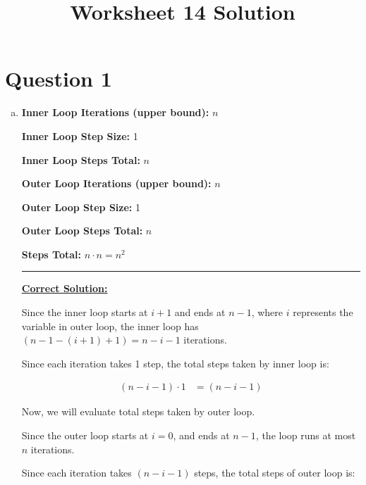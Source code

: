 \documentclass[12pt]{article}
\begin{document}
\title{Worksheet 14 Solution}
\maketitle

\section*{Question 1}
\begin{enumerate}[a.]
    \item

    \textbf{Inner Loop Iterations (upper bound):} $n$

    \textbf{Inner Loop Step Size:} 1

    \textbf{Inner Loop Steps Total:} $n$

    \bigskip

    \textbf{Outer Loop Iterations (upper bound):} $n$

    \textbf{Outer Loop Step Size:} 1

    \textbf{Outer Loop Steps Total:} $n$

    \bigskip

    \textbf{Steps Total:} $n \cdot n = n^2$

    \noindent\rule{\textwidth}{1pt}

    \bigskip

    \underline{\textbf{Correct Solution:}}

    Since the inner loop starts at $i+1$ and ends at $n-1$, where $i$ represents
    the variable in outer loop, the inner loop has $(n-1 - (i+1) + 1) = n - i - 1$
    iterations.

    \bigskip

    Since each iteration takes 1 step, the total steps taken by inner loop is:

    \begin{align}
        (n - i - 1) \cdot 1 &= (n - i - 1)
    \end{align}

    \bigskip

    Now, we will evaluate total steps taken by outer loop.

    \bigskip

    Since the outer loop starts at $i = 0$, and ends at $n-1$, the loop runs
    at most $n$ iterations.

    \bigskip

    Since each iteration takes $(n -i - 1)$ steps, the total steps of outer
    loop is:


\end{enumerate}
\end{document}
